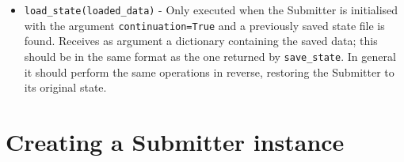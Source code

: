\documentclass[]{report}
\begin{document}
\begin{itemize}
	\item \lstinline|load_state(loaded_data)| - Only executed when the Submitter is initialised with the argument \lstinline|continuation=True| and a previously saved state file is found. Receives as argument a dictionary containing the saved data; this should be in the same format as the one returned by \lstinline|save_state|. In general it should perform the same operations in reverse, restoring the Submitter to its original state.
\end{itemize}

\section{Creating a Submitter instance}
\end{document}
